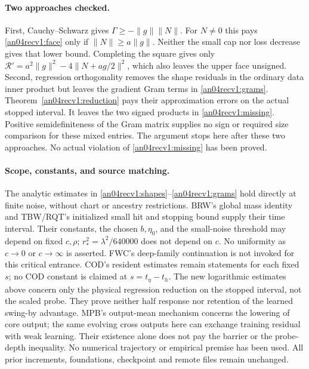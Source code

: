 \documentclass[11pt]{article}
\begin{document}
\paragraph{Two approaches checked.}
First, Cauchy--Schwarz gives
$\Gamma\ge-\|g\|\|N\|$.
For $N\ne0$ this pays \eqref{an04recv1:face} only if
$\|N\|\ge a\|g\|$. Neither the small cap nor loss decrease
gives that lower bound. Completing the square gives only
$\mathcal R'=a^2\|g\|^2-4\|N+ag/2\|^2$, which also
leaves the upper face unsigned.
Second, regression orthogonality removes the shape residuals in
the ordinary data inner product but leaves the gradient Gram terms
in \eqref{an04recv1:grams}. Theorem~\ref{an04recv1:reduction}
pays their approximation errors on the actual stopped interval.
It leaves the two signed products in \eqref{an04recv1:missing}.
Positive semidefiniteness of the Gram matrix supplies no sign or
required size comparison for these mixed entries. The argument
stops here after these two approaches. No actual violation of
\eqref{an04recv1:missing} has been proved.

\paragraph{Scope, constants, and source matching.}
The analytic estimates in \eqref{an04recv1:shapes}--\eqref{an04recv1:grams}
hold directly at finite noise, without chart or ancestry restrictions.
BRW's global mass identity and TBW/RQT's initialized small hit and
stopping bound supply their time interval. Their constants, the
chosen $b,\eta_0$, and the small-noise threshold may depend on fixed
$c,\rho$; $r_*^2=\lambda^2/640000$ does not depend on $c$.
No uniformity as $c\to0$ or $c\to\infty$ is asserted.
FWC's deep-family continuation is not invoked for this critical
entrance. COD's resident estimates remain statements for each fixed
$s$; no COD constant is claimed at $s=t_\eta-t_h$.
The new logarithmic estimates above concern only the physical
regression reduction on the stopped interval, not the scaled probe.
They prove neither half response nor retention of the learned
swing-by advantage. MPB's output-mean mechanism concerns the
lowering of core output; the same evolving cross outputs here can
exchange training residual with weak learning. Their existence
alone does not pay the barrier or the probe-depth inequality.
No numerical trajectory or empirical premise has been used.
All prior increments, foundations, checkpoint and remote files
remain unchanged.
\end{document}
